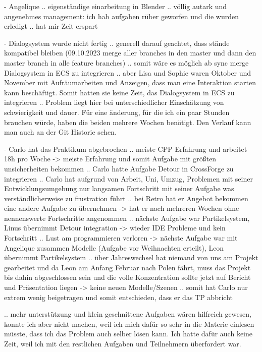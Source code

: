 - Angelique
.. eigenständige einarbeitung in Blender
.. völlig autark und angenehmes management: ich hab aufgaben rüber geworfen und die wurden erledigt
.. hat mir Zeit erspart

- Dialogsystem wurde nicht fertig
.. generell darauf geachtet, dass stände kompatibel bleiben (09.10.2023 merge aller branches in den master und dann den master branch in alle feature branches)
.. somit wäre es möglich ab sync merge Dialogsystem in ECS zu integrieren
.. aber Lisa und Sophie waren Oktober und November mit Aufräumarbeiten und Anzeigen, dass man eine Interaktion starten kann beschäftigt. Somit hatten sie keine Zeit, das Dialogsystem in ECS zu integrieren
.. Problem liegt hier bei unterschiedlicher Einschätzung von schwierigkeit und dauer. Für eine änderung, für die ich ein paar Stunden brauchen würde, haben die beiden mehrere Wochen benötigt. Den Verlauf kann man auch an der Git Historie sehen.


- Carlo hat das Praktikum abgebrochen
.. meiste CPP Erfahrung und arbeitet 18h pro Woche -> meiste Erfahrung und somit Aufgabe mit größten unsicherheiten bekommen
.. Carlo hatte Aufgabe Detour in CrossForge zu integrieren
.. Carlo hat aufgrund von Arbeit, Uni, Umzug, Problemen mit seiner Entwicklungsumgebung nur langsamen Fortschritt mit seiner Aufgabe was verständlicherweise zu frustration führt
.. bei Retro hat er Angebot bekommen eine andere Aufgabe zu übernehmen -> hat er nach mehreren Wochen ohne nennenswerte Fortschritte angenommen
.. nächste Aufgabe war Partikelsystem, Linus übernimmt Detour integration -> wieder IDE Probleme und kein Fortschritt
.. Lust am programmieren verloren -> nächste Aufgabe war mit Angelique zusammen Modelle (Aufgabe vor Weihnachten erteilt), Leon übernimmt Partikelsystem
.. über Jahreswechsel hat niemand von uns am Projekt gearbeitet und da Leon am Anfang Februar nach Polen fährt, muss das Projekt bis dahin abgeschlossen sein und die volle Konzentration sollte jetzt auf Bericht und Präsentation liegen -> keine neuen Modelle/Szenen
.. somit hat Carlo nur extrem wenig beigetragen und somit entschieden, dass er das TP abbricht

.. mehr unterstützung und klein geschnittene Aufgaben wären hilfreich gewesen, konnte ich aber nicht machen, weil ich mich dafür so sehr in die Materie einlesen müsste, dass ich das Problem auch selber lösen kann. Ich hatte dafür auch keine Zeit, weil ich mit den restlichen Aufgaben und Teilnehmern überfordert war.

